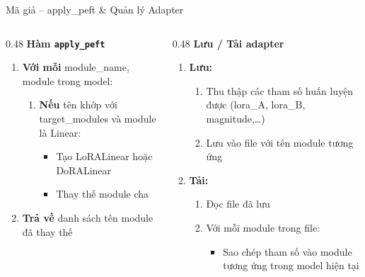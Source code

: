 \documentclass[11pt,aspectratio=169]{beamer}
\begin{document}
\begin{frame}[fragile]{Mã giả – apply\_peft \& Quản lý Adapter}
\footnotesize
\begin{columns}[T]

\begin{column}{0.48\textwidth}
\textbf{Hàm \texttt{apply\_peft}}
\begin{enumerate}
\item \textbf{Với mỗi} module\_name, module trong model:
   \begin{enumerate}
   \item \textbf{Nếu} tên khớp với target\_modules và module là Linear:
      \begin{itemize}
      \item Tạo LoRALinear hoặc DoRALinear
      \item Thay thế module cha
      \end{itemize}
   \end{enumerate}
\item \textbf{Trả về} danh sách tên module đã thay thế
\end{enumerate}
\end{column}

\begin{column}{0.48\textwidth}
\textbf{Lưu / Tải adapter}
\begin{enumerate}
\item \textbf{Lưu:}
   \begin{enumerate}
   \item Thu thập các tham số huấn luyện được (lora\_A, lora\_B, magnitude,…)
   \item Lưu vào file với tên module tương ứng
   \end{enumerate}
\item \textbf{Tải:}
   \begin{enumerate}
   \item Đọc file đã lưu
   \item Với mỗi module trong file:
      \begin{itemize}
      \item Sao chép tham số vào module tương ứng trong model hiện tại
      \end{itemize}
   \end{enumerate}
\end{enumerate}
\end{column}

\end{columns}
\end{frame}
\end{document}
